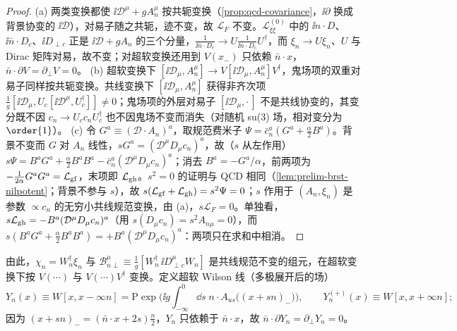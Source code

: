 \begin{proof}
(a) 两类变换都使 $\ii\mathcal D^\mu+gA_n^\mu$ 按共轭变换（\cref{prop:qcd-covariance}，$\ii\partial$ 换成背景协变的 $\ii\mathcal D$），对易子随之共轭，迹不变，故 $\mathcal L_F$ 不变。$\mathcal L^{(0)}_{\xi\xi}$ 中的 $\ii n\cdot D$、$\ii\bar n\cdot D_c$、$\ii D_{\perp c}$ 正是 $\ii\mathcal D+gA_n$ 的三个分量，$\frac1{\ii\bar n\cdot D_c}\to U\frac1{\ii\bar n\cdot D_c}U^\dagger$，而 $\xi_n\to U\xi_n$、$U$ 与 Dirac 矩阵对易，故不变；对超软变换还用到 $V(x_-)$ 只依赖 $\bar n\cdot x$，$\bar n\cdot\partial V=\partial_\perp V=0$。
(b) 超软变换下 $[\ii\mathcal D_\mu,A_n^\mu]\to V[\ii\mathcal D_\mu,A_n^\mu]V^\dagger$，鬼场项的双重对易子同样按共轭变换。共线变换下 $[\ii\mathcal D_\mu,A_n^\mu]$ 获得非齐次项 $\frac1g[\ii\mathcal D_\mu,U_c[\ii\mathcal D^\mu,U_c^\dagger]]\neq0$；鬼场项的外层对易子 $[\ii\mathcal D_\mu,\cdot\,]$ 不是共线协变的，其变分既不因 $c_n\to U_cc_nU_c^\dagger$ 也不因鬼场不变而消失（对随机 su(3) 场，相对变分为 $\order{1}$）。%
(c) 令 $G^a\equiv(\mathcal D\cdot A_n)^a$，取规范费米子 $\Psi=\bar c_n^a(G^a+\frac\alpha2B^a)$。背景不变而 $G$ 对 $A_n$ 线性，$sG^a=(\mathcal D^\mu D_\mu c_n)^a$，故（$s$ 从左作用）$s\Psi=B^aG^a+\frac\alpha2B^aB^a-\bar c_n^a(\mathcal D^\mu D_\mu c_n)^a$；消去 $B^a=-G^a/\alpha$，前两项为 $-\frac1{2\alpha}G^aG^a=\mathcal L_{\rm gf}$，末项即 $\mathcal L_{\rm gh}$。$s^2=0$ 的证明与 QCD 相同（\cref{lem:prelim-brst-nilpotent}；背景不参与 $s$），故 $s(\mathcal L_{\rm gf}+\mathcal L_{\rm gh})=s^2\Psi=0$；$s$ 作用于 $(A_n,\xi_n)$ 是参数 $\propto c_n$ 的无穷小共线规范变换，由 (a)，$s\mathcal L_F=0$。单独看，$s\mathcal L_{\rm gh}=-B^a(\mathcal D^\mu D_\mu c_n)^a$（用 $s(D_\mu c_n)=s^2A_{n\mu}=0$），而 $s(B^aG^a+\frac\alpha2B^aB^a)=+B^a(\mathcal D^\mu D_\mu c_n)^a$：两项只在求和中相消。
\end{proof}

由此，$\chi_n=W_n^\dagger\xi_n$ 与 $\mathcal B^\mu_{n\perp}\equiv\frac1g[W_n^\dagger\,\ii D^\mu_{\perp c}W_n]$ 是共线规范不变的组元，在超软变换下按 $V(\cdots)$ 与 $V(\cdots)V^\dagger$ 变换。定义超软 Wilson 线（多极展开后的场）
\begin{equation}\label{eq:scet-Yn}
Y_n(x)\equiv W[x,x-\infty n]=\mathrm P\exp\Big(\ii g\int_{-\infty}^0\dd s\;n\cdot A_{us}\big((x+sn)_-\big)\Big),\qquad
Y_n^{(+)}(x)\equiv W[x,x+\infty n];
\end{equation}
因为 $(x+sn)_-=(\bar n\cdot x+2s)\frac n2$，$Y_n$ 只依赖于 $\bar n\cdot x$，故 $\bar n\cdot\partial Y_n=\partial_\perp Y_n=0$。

